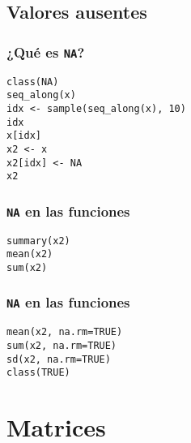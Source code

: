 \documentclass[bigger]{beamer}
\begin{document}
\subsection{Valores ausentes}
\label{sec-1-3}

   
\begin{frame}[fragile]
\frametitle{¿Qué es \texttt{NA}?}
\label{sec-1-3-1}


\lstset{language=R}
\begin{lstlisting}
class(NA)
seq_along(x)
idx <- sample(seq_along(x), 10)
idx
x[idx]
x2 <- x
x2[idx] <- NA
x2
\end{lstlisting}
\end{frame}
\begin{frame}[fragile]
\frametitle{\texttt{NA} en las funciones}
\label{sec-1-3-2}



\lstset{language=R}
\begin{lstlisting}
summary(x2)
mean(x2)
sum(x2)
\end{lstlisting}
\end{frame}
\begin{frame}[fragile]
\frametitle{\texttt{NA} en las funciones}
\label{sec-1-3-3}



\lstset{language=R}
\begin{lstlisting}
mean(x2, na.rm=TRUE)
sum(x2, na.rm=TRUE)
sd(x2, na.rm=TRUE)
class(TRUE)
\end{lstlisting}
\end{frame}
\section{Matrices}
\label{sec-2}
\end{document}
